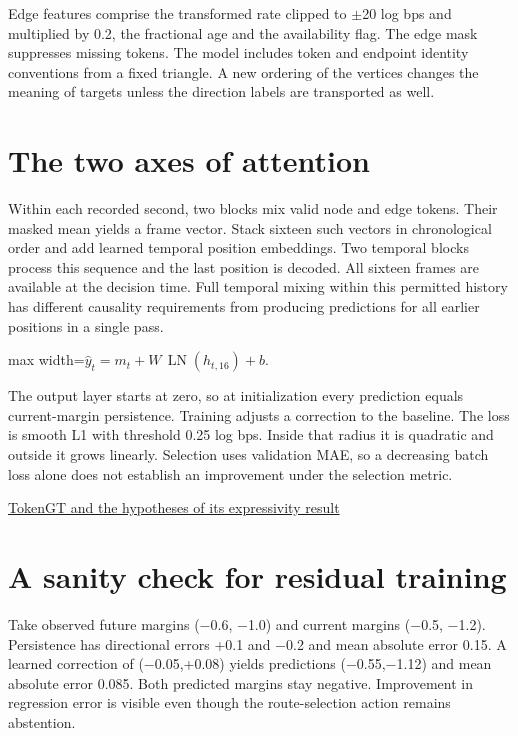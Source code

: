 \documentclass[11pt,oneside,openany]{book}
\begin{document}
Edge features comprise the transformed rate clipped to \ensuremath{\pm}20 log bps and multiplied by 0.2, the fractional age and the availability flag. The edge mask suppresses missing tokens. The model includes token and endpoint identity conventions from a fixed triangle. A new ordering of the vertices changes the meaning of targets unless the direction labels are transported as well.

\section*{The two axes of attention}
Within each recorded second, two blocks mix valid node and edge tokens. Their masked mean yields a frame vector. Stack sixteen such vectors in chronological order and add learned temporal position embeddings. Two temporal blocks process this sequence and the last position is decoded. All sixteen frames are available at the decision time. Full temporal mixing within this permitted history has different causality requirements from producing predictions for all earlier positions in a single pass.

\begin{center}\begin{adjustbox}{max width=\linewidth}$\displaystyle \widehat y_t=m_t+W\,\operatorname{LN}(h_{t,16})+b.$\end{adjustbox}\end{center}
The output layer starts at zero, so at initialization every prediction equals current-margin persistence. Training adjusts a correction to the baseline. The loss is smooth L1 with threshold 0.25 log bps. Inside that radius it is quadratic and outside it grows linearly. Selection uses validation MAE, so a decreasing batch loss alone does not establish an improvement under the selection metric.

{\small\sffamily\href{https://arxiv.org/abs/2207.02505}{TokenGT and the hypotheses of its expressivity result}\par}
\section*{A sanity check for residual training}
Take observed future margins (\ensuremath{-}0.6, \ensuremath{-}1.0) and current margins (\ensuremath{-}0.5, \ensuremath{-}1.2). Persistence has directional errors +0.1 and \ensuremath{-}0.2 and mean absolute error 0.15. A learned correction of (\ensuremath{-}0.05,+0.08) yields predictions (\ensuremath{-}0.55,\ensuremath{-}1.12) and mean absolute error 0.085. Both predicted margins stay negative. Improvement in regression error is visible even though the route-selection action remains abstention.
\end{document}
